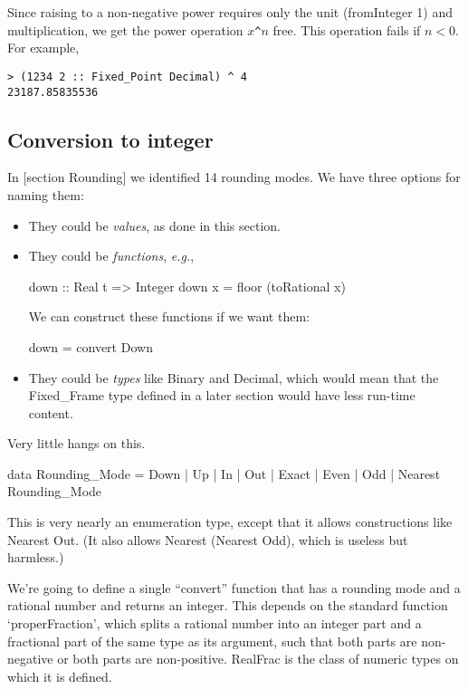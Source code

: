 \documentclass{article}
\begin{document}
Since raising to a non-negative power requires only the unit
(fromInteger 1) and multiplication, we get the power operation
$x$\verb|^|$n$ free.  This operation fails if $n<0$.  For
example,
\begin{verbatim}
> (1234 2 :: Fixed_Point Decimal) ^ 4
23187.85835536
\end{verbatim}

\subsection{Conversion to integer}

In [section Rounding] we identified 14 rounding modes.
We have three options for naming them:
\begin{itemize}
\item They could be {\it values}, as done in this section.
\item They could be {\it functions}, {\it e.g.},
\begin{code}%
down :: Real t => Integer
down x = floor (toRational x)
\end{code}
We can construct these functions if we want them:
\begin{code}%
down = convert Down
\end{code}
\item They could be {\it types} like Binary and Decimal,
which would mean that the Fixed\_Frame type defined in a
later section would have less run-time content.
\end{itemize}
Very little hangs on this.

\begin{code}
data Rounding_Mode
   = Down
   | Up
   | In
   | Out
   | Exact
   | Even
   | Odd
   | Nearest Rounding_Mode
\end{code}

This is very nearly an enumeration type, except that it
allows constructions like Nearest Out.  (It also allows
Nearest (Nearest Odd), which is useless but harmless.)

We're going to define a single ``convert'' function that has
a rounding mode and a rational number and returns an integer.
This depends on the standard function `properFraction',
which splits a rational number into an integer part and
a fractional part of the same type as its argument, such
that both parts are non-negative or both parts are non-positive.
RealFrac is the class of numeric types on which it is defined.
\end{document}

